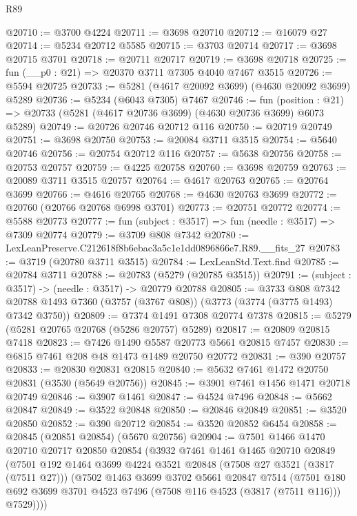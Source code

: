 \begin{lexlean}{R89}
\begin{coremodule}
@20710 := @3700 @4224
@20711 := @3698 @20710
@20712 := @16079 @27
@20714 := @5234 @20712 @5585
@20715 := @3703 @20714
@20717 := @3698 @20715 @3701
@20718 := @20711 @20717
@20719 := @3698 @20718
@20725 := fun (__p0 : @21) => @20370 @3711 @7305 @4040 @7467 @3515
@20726 := @5594 @20725
@20733 := @5281 (@4617 @20092 @3699) (@4630 @20092 @3699) @5289
@20736 := @5234 (@6043 @7305) @7467
@20746 := fun (position : @21) =>
  @20733 (@5281 (@4617 @20736 @3699) (@4630 @20736 @3699) @6073 @5289)
@20749 := @20726 @20746 @20712 @116
@20750 := @20719 @20749
@20751 := @3698 @20750
@20753 := @20084 @3711 @3515
@20754 := @5640 @20746
@20756 := @20754 @20712 @116
@20757 := @5638 @20756
@20758 := @20753 @20757
@20759 := @4225 @20758
@20760 := @3698 @20759
@20763 := @20089 @3711 @3515 @20757
@20764 := @4617 @20763
@20765 := @20764 @3699
@20766 := @4616 @20765
@20768 := @4630 @20763 @3699
@20772 := @20760 (@20766 @20768 @6998 @3701)
@20773 := @20751 @20772
@20774 := @5588 @20773
@20777 := fun (subject : @3517) => fun (needle : @3517) => @7309 @20774
@20779 := @3709 @808 @7342
@20780 := LexLeanPreserve.C212618f8b6ebac3a5c1e1dd0896866e7.R89.__fits_27
@20783 := @3719 (@20780 @3711 @3515)
@20784 := LexLeanStd.Text.find
@20785 := @20784 @3711
@20788 := @20783 (@5279 (@20785 @3515))
@20791 := (subject : @3517) -> (needle : @3517) -> @20779 @20788
@20805 := @3733
    @808
    @7342
    @20788
    @1493
    @7360
    (@3757 (@3767 @808))
    (@3773 (@3774 (@3775 @1493) @7342 @3750))
@20809 := @7374 @1491 @7308 @20774 @7378
@20815 := @5279 (@5281 @20765 @20768 (@5286 @20757) @5289)
@20817 := @20809 @20815 @7418
@20823 := @7426 @1490 @5587 @20773 @5661 @20815 @7457
@20830 := @6815 @7461 @208 @48 @1473 @1489 @20750 @20772
@20831 := @390 @20757
@20833 := @20830 @20831 @20815
@20840 := @5632 @7461 @1472 @20750 @20831 (@3530 (@5649 @20756))
@20845 := @3901 @7461 @1456 @1471 @20718 @20749
@20846 := @3907 @1461
@20847 := @4524 @7496
@20848 := @5662 @20847
@20849 := @3522 @20848
@20850 := @20846 @20849
@20851 := @3520 @20850
@20852 := @390 @20712
@20854 := @3520 @20852 @6454
@20858 := @20845 (@20851 @20854) (@5670 @20756)
@20904 := @7501
    @1466
    @1470
    @20710
    @20717
    @20850
    @20854
    (@3932
      @7461
      @1461
      @1465
      @20710
      @20849
      (@7501
        @192
        @1464
        @3699
        @4224
        @3521
        @20848
        (@7508 @27 @3521 (@3817 (@7511 @27)))
        (@7502
          @1463
          @3699
          @3702
          @5661
          @20847
          @7514
          (@7501 @180 @692 @3699 @3701 @4523 @7496 (@7508 @116 @4523 (@3817 (@7511 @116))) @7529))))

\end{coremodule}
\end{lexlean}
